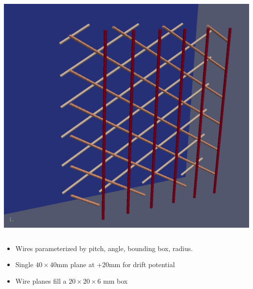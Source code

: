 \documentclass[xcolor=dvipsnames]{beamer}
\begin{document}
\begin{frame}
\begin{columns}
\begin{column}{0.5\textwidth}
\begin{center}
        \includegraphics[width=\textwidth]{wires-iso.png}
      \end{center}
    \end{column}
  \end{columns}
  

  \begin{itemize}
  \item Wires parameterized by pitch, angle, bounding box, radius.
  \item Single $40 \times 40$mm plane at +20mm for drift potential
  \item Wire planes fill a $20 \times 20 \times 6$ mm box
  \end{itemize}


\end{frame}
\end{document}
